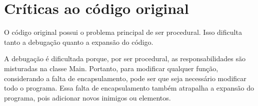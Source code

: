\documentclass[
	12pt,				%
	oneside,			%
	a4paper,			%
	english,			%
	brazil				%
	]{abntex2ppgsi}
\begin{document}
\frenchspacing 


%
% 
%
\imprimircapa

\tableofcontents*
\cleardoublepage



\textual



% 
%
%
\chapter{Críticas ao código original}

O código original possui o problema principal de ser procedural. Isso dificulta tanto a debugação quanto a expansão do código.

A debugação é dificultada porque, por ser procedural, as responsabilidades são misturadas na classe Main. Portanto, para modificar qualquer função, considerando a falta de encapsulamento, pode ser que seja necessário modificar todo o programa. Essa falta de encapsulamento também atrapalha a expansão do programa, pois adicionar novos inimigos ou elementos.
\end{document}
